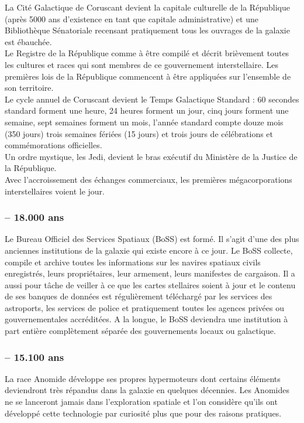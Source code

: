 \documentclass[twoside]{article}
\begin{document}
La Cité Galactique de Coruscant devient la capitale culturelle de la République (après 5000 ans d'existence en tant que capitale administrative) et une Bibliothèque Sénatoriale recensant pratiquement tous les ouvrages de la galaxie est ébauchée. \\

Le Registre de la République comme à être compilé et décrit brièvement toutes les cultures et races qui sont membres de ce gouvernement interstellaire. 
Les premières lois de la République commencent à être appliquées sur l'ensemble de son territoire. \\

Le cycle annuel de Coruscant devient le Temps Galactique Standard : 60 secondes standard forment une heure, 24 heures forment un jour, cinq jours forment une semaine, sept semaines forment un mois, l'année standard compte douze mois (350 jours) trois semaines fériées (15 jours) et trois jours de célébrations et commémorations officielles.\\

Un ordre mystique, les Jedi, devient le bras exécutif du Ministère de la Justice de la République.\\

Avec l'accroissement des échanges commerciaux, les premières mégacorporations interstellaires voient le jour. 
\subsubsection*{-- 18.000 ans}
Le Bureau Officiel des Services Spatiaux (BoSS) est formé. Il s'agit d'une des plus anciennes institutions de la galaxie qui existe encore à ce jour. Le BoSS collecte, compile et archive toutes les informations sur les navires spatiaux civils enregistrés, leurs propriétaires, leur armement, leurs manifestes de cargaison. Il a aussi pour tâche de veiller à ce que les cartes stellaires soient à jour et le contenu de ses banques de données est régulièrement téléchargé par les services des astroports, les services de police et pratiquement toutes les agences privées ou gouvernementales accréditées. A la longue, le BoSS deviendra une institution à part entière complètement séparée des gouvernements locaux ou galactique. 
\subsubsection*{-- 15.100 ans}
La race Anomide développe ses propres hypermoteurs dont certains éléments deviendront très répandus dans la galaxie en quelques décennies. Les Anomides ne se lanceront jamais dans l'exploration spatiale et l'on considère qu'ils ont développé cette technologie par curiosité plus que pour des raisons pratiques. 
\end{document}
